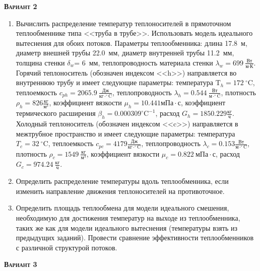 \textsc{\textbf{Вариант 2}}

\begin{enumerate} 
\item Вычислить распределение температур теплоносителей в прямоточном теплообменнике типа <<труба в трубе>>. Использовать модель идеального вытеснения для обоих потоков. Параметры теплообменника: длина  17.8~м, диаметр внешней трубы 22.0~мм,  диаметр внутренней трубы 11.2~мм, толщина стенки $\delta_{w}$=     6~мм,  теплопроводность материала стенки $\lambda_{w}=  699~\frac{\text{Вт}}{\text{м} \cdot \text{К}}$.  Горячий теплоноситель (обозначен индексом <<h>>) направляется во внутреннюю трубу и	 имеет следующие параметры: температура $\text{T}_{h}= 172~^\circ\mathrm{C}$, теплоемкость	  $c_{p{h}}= 2065.9~\frac{\text{Дж}}{\text{кг} \cdot ^\circ\mathrm{C}}$, теплопроводность 		$\lambda_{h}= 0.544~\frac{\text{Вт}}{\text{м} \cdot ^\circ\mathrm{C}}$, плотность 		$\rho_{h}=  826 \frac{\text{кг}}{\text{м}^3}$, коэффициент вязкости $\mu_{h}=10.441 \text{мПа} 		\cdot \text{с} $, коэффициент термического расширения $\beta_{h}=0.000309 ^\circ\mathrm{C}^{-1}$,		 расход $G_{h}= 1850.229 \frac{\text{кг}}{\text{ч}}$. Холодный теплоноситель (обозначен индексом <<c>>) 		 направляется в межтрубное пространство и имеет следующие параметры: температура $T_{c}=   32		 ~^\circ\mathrm{C}$, теплоемкость $c_{p{c}}= 4179 \frac{\text{Дж}}{\text{кг} \cdot ^\circ\mathrm{C}}$,			 теплопроводность $\lambda_{c}=0.153 \frac{\text{Вт}}{\text{м} \cdot ^\circ\mathrm{C}}$, плотность 			 $\rho_{c}=  1549~\frac{\text{кг}}{\text{м}^3}$, коэффициент вязкости $\mu_{c}=0.822~\text{мПа} \cdot \text{с} $, 			 расход $G_{c}=974.24~\frac{\text{кг}}{\text{ч}}$. 

\item Определить распределение температуры вдоль теплообменника, если 	изменить направление движения теплоносителей на противоточное.

\item Определить площадь теплообмена для модели идеального смешения, необходимую для достижения 	температур на выходе из теплообменника, таких же как для модели идеального вытеснения (температуры взять из предыдущих заданий).	Провести сравнение эффективности теплообменников с различной структурой потоков.

\end{enumerate}

\textsc{\textbf{Вариант 3}}


